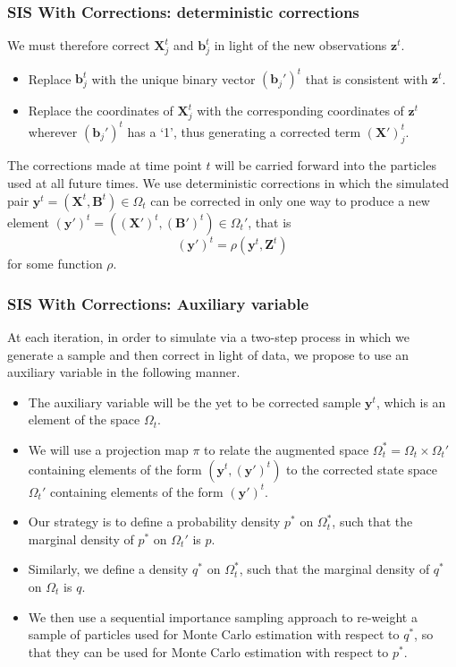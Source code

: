 \documentclass[9pt, xcolor={dvipsnames,svgnames,table}]{beamer}
\begin{document}
\begin{frame}
    \frametitle{SIS With Corrections: deterministic corrections}
    We must therefore correct $\bm{X}^{t}_j$ and $\bm{b}^{t}_j$ in light of the new observations $\bm{z}^{t}$. 
    \begin{itemize}
        \item Replace $\bm{b}^{t}_j$ with the unique binary vector $(\bm{b}_j')^{t}$ that is consistent with $\bm{z}^{t}$.
        \item Replace the coordinates of $\bm{X}^{t}_j$ with the corresponding coordinates of $\bm{z}^{t}$ wherever $(\bm{b}_j')^{t}$ has a `1', thus generating a corrected term $\bm{(X')}^{t}_j$.
    \end{itemize}  
    The corrections made at time point $t$ will be carried forward into the particles used at all future times. 
    We use deterministic corrections in which the simulated pair $\bm{y}^{t} = (\bm{X}^{t}, \bm{B}^{t}) \in \Omega_t$ can be corrected in only one way to produce a new element $\bm{(y')}^{t} = (\bm{(X')}^t, \bm{(B')}^t) \in \Omega_t'$, that is
    \begin{equation*}
        \bm{(y')}^{t} = \rho(\bm{y}^{t},\bm{Z}^{t})
    \end{equation*}
    for some function $\rho$.
\end{frame}


\begin{frame}
    \frametitle{SIS With Corrections: Auxiliary variable}
    At each iteration, in order to simulate via a two-step process in which we generate a sample and then correct in light of data, we propose to use an auxiliary variable in the following manner.
    \begin{itemize}
        \item The auxiliary variable will be the yet to be corrected sample $\bm{y}^{t}$, which is an element of the space $\Omega_t$.
        \item We will use a projection map $\pi$ to relate the augmented space $\Omega^*_t = \Omega_t \times \Omega_t'$ containing elements of the form $(\bm{y}^{t}, \bm{(y')}^{t})$ to the corrected state space $\Omega_t'$ containing elements of the form $\bm{(y')}^{t}$.
        \item Our strategy is to define a probability density $p^*$ on $\Omega^*_t$, such that the marginal density of $p^*$ on $\Omega_t'$ is $p$.
        \item Similarly, we define a density $q^*$ on $\Omega^*_t$, such that the marginal density of $q^*$ on $\Omega_t$ is $q$.
        \item We then use a sequential importance sampling approach to re-weight a sample of particles used for Monte Carlo estimation with respect to $q^*$, so that they can be used for Monte Carlo estimation with respect to $p^*$.
    \end{itemize}
\end{frame}
\end{document}
